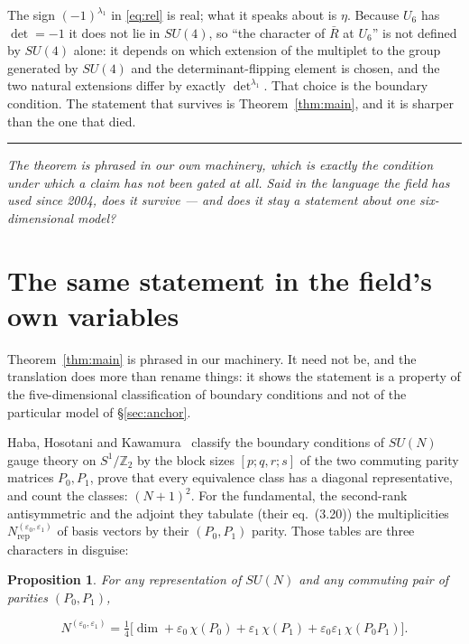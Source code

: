 \documentclass[11pt,a4paper]{article}
\newtheorem{proposition}{Proposition}
\newcommand{\ZZ}{\mathbb{Z}}
\newcommand{\su}[1]{SU(#1)}
\newcommand{\bridge}[1]{\par\medskip\noindent
  \textcolor{hdrblue!45}{\rule{2.2cm}{0.6pt}}\;\;\parbox[t]{0.84\textwidth}{\small\itshape
  \textcolor{hdrblue!85}{#1}}\par\medskip}
\newenvironment{keyeq}
  {\begin{center}\setlength{\fboxsep}{9pt}\setlength{\fboxrule}{0.8pt}%
   \begin{lrbox}{\keyeqbox}\begin{minipage}{0.88\textwidth}}
  {\end{minipage}\end{lrbox}%
   \fcolorbox{hdrblue!55}{hdrblue!6}{\usebox{\keyeqbox}}\end{center}}
\begin{document}
The sign $(-1)^{\lambda_1}$ in \eqref{eq:rel} is real; what it speaks about is $\eta$. Because $U_6$
has $\det=-1$ it does not lie in $\su4$, so ``the character of $\bar R$ at $U_6$'' is not defined by
$\su4$ alone: it depends on which extension of the multiplet to the group generated by $\su4$ and
the determinant-flipping element is chosen, and the two natural extensions differ by exactly
$\det^{\lambda_1}$. That choice is the boundary condition. The statement that survives is
Theorem~\ref{thm:main}, and it is sharper than the one that died.

\bridge{The theorem is phrased in our own machinery, which is exactly the condition under which a
claim has not been gated at all. Said in the language the field has used since 2004, does it survive
--- and does it stay a statement about one six-dimensional model?}

\section{The same statement in the field's own variables}\label{sec:hhk}

Theorem~\ref{thm:main} is phrased in our machinery. It need not be, and the translation does more
than rename things: it shows the statement is a property of the five-dimensional classification of
boundary conditions and not of the particular model of \S\ref{sec:anchor}.

Haba, Hosotani and Kawamura~\cite{HHK} classify the boundary conditions of $\su N$ gauge theory on
$S^1/\ZZ_2$ by the block sizes $[p;q,r;s]$ of the two commuting parity matrices $P_0,P_1$, prove that
every equivalence class has a diagonal representative, and count the classes: $(N+1)^2$. For the
fundamental, the second-rank antisymmetric and the adjoint they tabulate (their eq.~(3.20)) the
multiplicities $N^{(\varepsilon_0,\varepsilon_1)}_{\mathrm{rep}}$ of basis vectors by their
$(P_0,P_1)$ parity. Those tables are three characters in disguise:

\begin{proposition}\label{prop:three}
For any representation of $\su N$ and any commuting pair of parities $(P_0,P_1)$,
\begin{keyeq}
\begin{equation}\label{eq:threechar}
N^{(\varepsilon_0,\varepsilon_1)}
=\tfrac14\Big[\dim+\varepsilon_0\,\chi(P_0)+\varepsilon_1\,\chi(P_1)
+\varepsilon_0\varepsilon_1\,\chi(P_0P_1)\Big].
\end{equation}
\end{keyeq}
\end{proposition}
\end{document}
